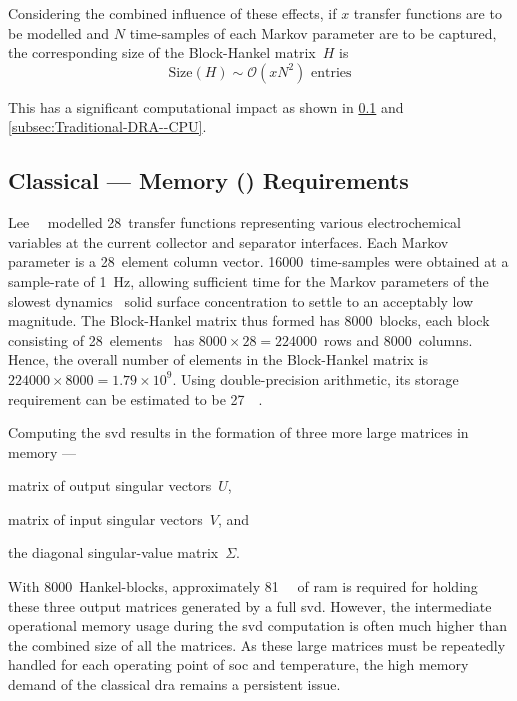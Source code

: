 Considering the combined  influence of these effects, if  $x$ transfer functions
are to  be modelled  and $N$  time-samples of  each Markov  parameter are  to be
captured, the corresponding size of the Block-Hankel matrix~$H$ is
\begin{equation}
    \text{Size}(H)\sim \mathcal{O}(x N^2)\text{ entries}
\end{equation}

This    has    a    significant     computational    impact    as    shown    in
\cref{subsec:Traditional-DRA--Memory} and \cref{subsec:Traditional-DRA--CPU}.

\subsection{Classical  --- Memory () Requirements}\label{subsec:Traditional-DRA--Memory}

Lee~\etal~\cite{Lee2012a}  modelled 28~transfer  functions representing  various
electrochemical  variables at  the current  collector and  separator interfaces.
Each Markov  parameter is  a 28~element  column vector.  16000~time-samples were
obtained at  a sample-rate of  \SI{1}{\hertz}, allowing sufficient time  for the
Markov parameters of  the slowest dynamics \ie~solid  surface concentration to
settle to an  acceptably low magnitude. The Block-Hankel matrix  thus formed has
8000~blocks,  each  block  consisting  of 28~elements  \ie~has  $8000  \times
28=224000$~rows  and 8000~columns.  Hence,  the overall  number  of elements  in
the  Block-Hankel  matrix is  $224000  \times  8000=1.79 \times  10^{9}$.  Using
double-precision  arithmetic, its  storage requirement  can be  estimated to  be
\approx \SI{27}{\giga\byte}.

Computing the \gls{svd} results in the formation of three more large matrices in
memory ---
\begin{enumerate*}[label=\roman*)]
    \item matrix   of   output  singular   vectors~$U$,
    \item matrix of  input  singular vectors~$V$, and
    \item the diagonal singular-value  matrix~$\Sigma$.
\end{enumerate*}
With  8000~Hankel-blocks,  approximately  \SI{81}{\giga\byte}  of  \gls{ram}  is
required for holding these three output  matrices generated by a full \gls{svd}.
However,  the  intermediate  operational   memory  usage  during  the  \gls{svd}
computation is often much higher than the  combined size of all the matrices. As
these large  matrices must  be repeatedly  handled for  each operating  point of
\gls{soc} and  temperature, the  high memory demand  of the  classical \gls{dra}
remains a persistent issue.

